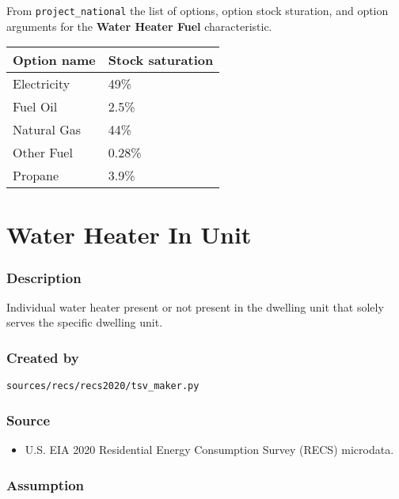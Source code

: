 From \texttt{project\_national} the list of options, option stock
sturation, and option arguments for the \textbf{Water Heater Fuel}
characteristic.

\begin{longtable}[]{@{}ll@{}}
\toprule\noalign{}
Option name & Stock saturation \\
\midrule\noalign{}
\endhead
\bottomrule\noalign{}
\endlastfoot
Electricity & 49\% \\
Fuel Oil & 2.5\% \\
Natural Gas & 44\% \\
Other Fuel & 0.28\% \\
Propane & 3.9\% \\
\end{longtable}

\section{Water Heater In Unit}\label{water_heater_in_unit}

\subsubsection{Description}\label{description-147}

Individual water heater present or not present in the dwelling unit that
solely serves the specific dwelling unit.

\subsubsection{Created by}\label{created-by-148}

\texttt{sources/recs/recs2020/tsv\_maker.py}

\subsubsection{Source}\label{source-150}

\begin{itemize}
 
\item
  U.S. EIA 2020 Residential Energy Consumption Survey (RECS) microdata.
\end{itemize}

\subsubsection{Assumption}\label{assumption-85}

